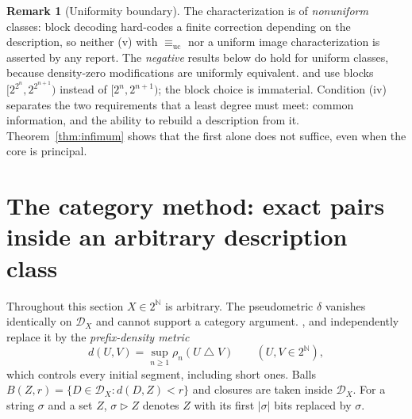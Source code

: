 \documentclass[11pt,letterpaper]{article}
\theoremstyle{definition}
\newtheorem{remark}[definition]{Remark}
\numberwithin{equation}{section}
\newcommand{\N}{\mathbb N}
\newcommand{\Cantor}{2^{\N}}
\newcommand{\equc}{\equiv_{\mathrm{uc}}}
\newcommand{\DX}[1]{\mathcal D_{#1}}
\newcommand{\sd}{\mathbin{\triangle}}
\newcommand{\patch}{\mathbin{\triangleright}}
\newcommand{\rep}[1]{\leavevmode{\sffamily\small\color{Steel}R#1}}
\begin{document}
\begin{remark}[Uniformity boundary]\label{rem:uniformboundary}
The characterization is of \emph{nonuniform} classes: block decoding hard-codes a finite correction depending on the description, so neither (v) with $\equc$ nor a uniform image characterization is asserted by any report. The \emph{negative} results below do hold for uniform classes, because density-zero modifications are uniformly equivalent. \rep1 and \rep5 use blocks $[2^{2^n},2^{2^{n+1}})$ instead of $[2^n,2^{n+1})$; the block choice is immaterial. Condition (iv) separates the two requirements that a least degree must meet: common information, and the ability to rebuild a description from it. Theorem~\ref{thm:infimum} shows that the first alone does not suffice, even when the core is principal.
\end{remark}

\section{The category method: exact pairs inside an arbitrary description class}\label{sec:category}
Throughout this section $X\in\Cantor$ is arbitrary. The pseudometric $\delta$ vanishes identically on $\DX X$ and cannot support a category argument. \rep1, \rep8 and \rep9 independently replace it by the \emph{prefix-density metric}
\begin{equation}\label{eq:metric}
 d(U,V)=\sup_{n\ge1}\rho_n(U\sd V)\qquad(U,V\in\Cantor),
\end{equation}
which controls every initial segment, including short ones. Balls $B(Z,r)=\{D\in\DX X:d(D,Z)<r\}$ and closures are taken inside $\DX X$. For a string $\sigma$ and a set $Z$, $\sigma\patch Z$ denotes $Z$ with its first $|\sigma|$ bits replaced by $\sigma$.
\end{document}
